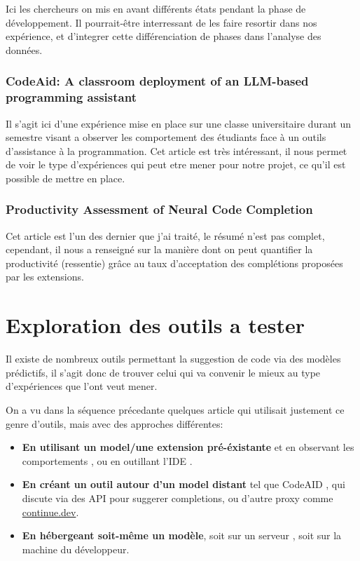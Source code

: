Ici les chercheurs on mis en avant différents états pendant la phase de développement.
Il pourrait-être interressant de les faire resortir dans nos expérience, et d'integrer cette différenciation de phases dans l'analyse des données.


\subsubsection{CodeAid: A classroom deployment of an LLM-based programming assistant \cite{codeaid}}

Il s'agit ici d'une expérience mise en place sur une classe universitaire durant un semestre visant a observer les comportement des étudiants
face à un outils d'assistance à la programmation.
Cet article est très intéressant, il nous permet de voir le type d'expériences qui peut etre mener pour notre projet, ce qu'il est possible de mettre en place.


\subsubsection{Productivity Assessment of Neural Code Completion \cite{productivity-assess}}

Cet article est l'un des dernier que j'ai traité, le résumé n'est pas complet, cependant, il nous a renseigné sur la manière dont on peut
quantifier la productivité (ressentie) grâce au taux d'acceptation des complétions proposées par les extensions.


\section{Exploration des outils a tester}
\label{explo}

Il existe de nombreux outils permettant la suggestion de code via des modèles prédictifs, il s'agit donc de trouver celui qui va convenir le mieux au type d'expériences que l'ont veut mener.

On a vu dans la séquence précedante quelques article qui utilisait justement ce genre d'outils, mais avec des approches différentes:

\begin{itemize}
  \item \textbf{En utilisant un model/une extension pré-éxistante} et en observant les comportements \cite{grouded}, ou en outillant l'IDE \cite{productivity-assess}.
  \item \textbf{En créant un outil autour d'un model distant} tel que CodeAID \cite{codeaid}, qui discute via des API pour suggerer completions, ou d'autre proxy comme \href{https://continue.dev}{continue.dev}.
  \item \textbf{En hébergeant soit-même un modèle}, soit sur un serveur \cite{llm-online-offline}, soit sur la machine du développeur.
\end{itemize}

